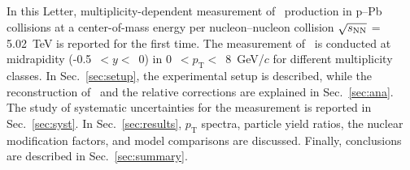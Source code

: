 In this Letter, multiplicity-dependent measurement of \fzero~production in p--Pb collisions at a center-of-mass energy per nucleon--nucleon collision $\sqrt{s_{\rm NN}}$ = 5.02~TeV is reported for the first time. The measurement of \fzero~is conducted at midrapidity (-0.5~$<y<$~0) in 0~$<p_{\mathrm{T}}<$~8~GeV/$c$ for different multiplicity classes. In Sec.~\ref{sec:setup}, the experimental setup is described, while the reconstruction of \fzero\ and the relative corrections are explained in Sec.~\ref{sec:ana}. The study of systematic uncertainties for the measurement is reported in Sec.~\ref{sec:syst}. In Sec.~\ref{sec:results}, $p_{\mathrm{T}}$ spectra, particle yield ratios, the nuclear modification factors, and model comparisons are discussed. Finally, conclusions are described in Sec.~\ref{sec:summary}.


\label{sec:intro}



